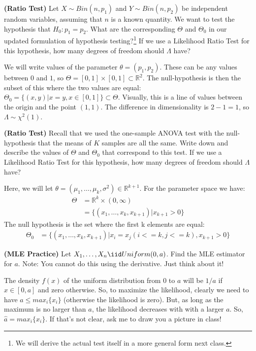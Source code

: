 
\textbf{(Ratio Test)} Let $X \sim Bin(n, p_1)$ and $Y \sim Bin(n, p_2)$ be
independent random variables, assuming that $n$ is a known quantity. We want
to test the hypothesis that $H_0: p_1 = p_2$. What are the corresponding
$\Theta$ and $\Theta_0$ in
our updated formulation of hypothesis testing?\footnote{
  We will derive the actual test itself in a more general form next
  class.
} If we use a Likelihood Ratio Test for this hypothesis, how many degrees of
freedom should $\Lambda$ have?


We will write values of the parameter $\theta = (p_1, p_2)$. These can be
any values between $0$ and $1$, so  $\Theta = [0, 1] \times [0, 1] \subset \mathbb{R}^2$.
The null-hypothesis is then the subset of this where the two values are equal:
$\Theta_0 = \{(x, y) | x = y, x \in [0, 1] \} \subset \Theta$. Visually, this 
is a line of values between the origin and the point $(1, 1)$. The difference
in dimensionality is $2 - 1 = 1$, so $\Lambda \sim \chi^2(1)$.


\textbf{(Ratio Test)} Recall that we used the one-sample ANOVA test with the
null-hypothesis that the means of $K$ samples are all the same. Write down and
describe the values of $\Theta$ and $\Theta_0$ that correspond to this test. 
If we use a Likelihood Ratio Test for this hypothesis, how many degrees of
freedom should $\Lambda$ have?


Here, we will let $\theta = (\mu_1, \ldots, \mu_k, \sigma^2) \in \mathbb{R}^{k+1}$.
For the parameter space we have:
\begin{align*}
\Theta &= \mathbb{R}^k \times (0, \infty) \\
&= \{ (x_1, \ldots, x_k, x_{k+1}) | x_{k+1} > 0 \}
\end{align*}
The null hypothesis is the set where the first k elements are equal:
\begin{align*}
\Theta_0 &= \{ (x_1, \ldots, x_k, x_{k+1}) | x_{i} = x_{j} (i <= k, j <=k), x_{k+1} > 0 \}
\end{align*}


\textbf{(MLE Practice)} Let $X_1, \ldots, X_n \iid Uniform(0, a)$. Find the MLE
estimator for $a$. Note: You cannot do this using the derivative. Just think about it!


The density $f(x)$ of the uniform distribution from $0$ to $a$ will be $1/a$ if 
$x \in [0, a]$ and zero otherwise. So, to maximize the likelihood, clearly we need
to have $a \leq max_i \{x_i\}$ (otherwise the likelihood is zero). But, as long as the
maximum is no larger than $a$, the likelihood decreases with with a larger $a$. So,
$\hat{a} = max_i \{x_i\}$. If that's not clear, ask me to draw you a picture in class!
